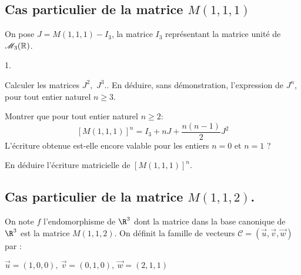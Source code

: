 \documentclass[11pt]{article}%
\begin{document}
\subsection{Cas particulier de la matrice $M\left( 1,1,1\right) $}

On pose $J = M\left( 1,1,1\right) -I_{3}$, la matrice $I_{3}$
représentant
la matrice unité de $\mathscr{M}_{3}(\mathbb{R}) $.

\begin{noliste}{1.}
 \setlength{\itemsep}{4mm}
\item Calculer les matrices $J^{2},$ $J^{3}.$. En déduire, sans
démonstration, l'expression de $J^{n}$, pour tout entier naturel $n\geq
3.$

\item Montrer que pour tout entier naturel $n\geq 2 :$
\[
\left[ M\left( 1,1,1\right) \right] ^{n} = I_{3} + nJ + \frac{n\left(
n-1\right) }{2}J^{2}
\]
L'écriture obtenue est-elle encore valable pour les entiers $n = 0$ et
$n = 1
$ ?

\item En déduire l'écriture matricielle de $\left[ M\left(
1,1,1\right) \right] ^{n}$.
\end{noliste}

\subsection{Cas particulier de la matrice $M\left( 1,1,2\right) $.}

On note $f$ l'endomorphisme de $\R^{3}$ dont la matrice dans la base
canonique de $\R^{3}$ est la matrice $M\left( 1,1,2\right) $. On
définit la famille de vecteurs $\mathcal{C} = \left(
\vec{u},\vec{v},\vec{w}\right) $ par :

$\vec{u} = \left( 1,0,0\right),\ \vec{v} = \left( 0,1,0\right),\
\vec{w} = \left( 2,1,1\right) $
\end{document}

